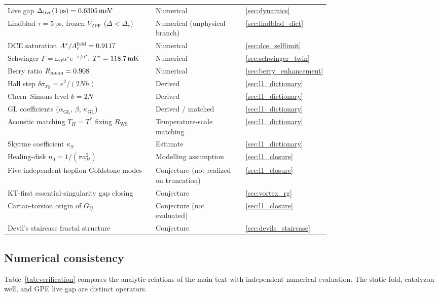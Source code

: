 \documentclass[11pt,letterpaper]{article}
\begin{document}
\begin{table}[htbp]
\begin{tabular}{p{0.46\linewidth}p{0.28\linewidth}l}
Live gap $\Delta_{\mathrm{live}}(1\,\mathrm{ps})=0.6305\,\mathrm{meV}$ & Numerical & \ref{sec:dynamics} \\
Lindblad $\tau=5$\,ps, frozen $V_{\mathrm{ZPF}}$ ($\Delta<\Delta_c$) & Numerical (unphysical branch) & \ref{sec:lindblad_dict} \\
DCE saturation $A^*/A_c^{\mathrm{fold}}=0.9117$ & Numerical & \ref{sec:dce_selflimit} \\
Schwinger $\Gamma=\omega_0\alpha^\star e^{-\pi/\alpha^\star}$; $T^*=118.7\,\mathrm{mK}$ & Numerical & \ref{sec:schwinger_twin} \\
Berry ratio $R_{\mathrm{mean}}=0.908$ & Numerical & \ref{sec:berry_enhancement} \\
Hall step $\delta\sigma_{xy}=e^2/(2Nh)$ & Derived & \ref{sec:l1_dictionary} \\
Chern--Simons level $k=2N$ & Derived & \ref{sec:l1_dictionary} \\
GL coefficients ($\alpha_{\mathrm{GL}}$, $\beta$, $\kappa_{\mathrm{GL}}$) & Derived / matched & \ref{sec:l1_dictionary} \\
Acoustic matching $T_H=T^*$ fixing $R_{\mathrm{WS}}$ & Temperature-scale matching & \ref{sec:l1_dictionary} \\
Skyrme coefficient $\kappa_S$ & Estimate & \ref{sec:l1_dictionary} \\
Healing-disk $n_0=1/(\pi a_H^2)$ & Modelling assumption & \ref{sec:l1_closure} \\
Five independent hopfion Goldstone modes & Conjecture (not realized on truncation) & \ref{sec:l1_closure} \\
KT-first essential-singularity gap closing & Conjecture & \ref{sec:vortex_rg} \\
Cartan-torsion origin of $G_{ij}$ & Conjecture (not evaluated) & \ref{sec:l1_closure} \\
Devil's staircase fractal structure & Conjecture & \ref{sec:devils_staircase} \\
\hline
\end{tabular}
\label{tab:epistemic}
\end{table}

\subsection{Numerical consistency}
\label{app:verification}

Table~\ref{tab:verification} compares the analytic relations of the main text with independent numerical evaluation. The static fold, catalyzon well, and GPE live gap are distinct operators.
\end{document}
